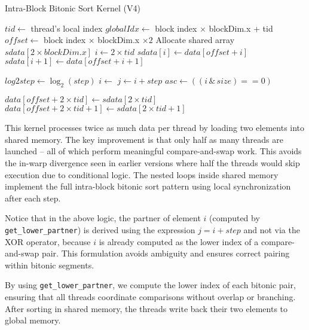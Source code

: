 \documentclass{article}
\begin{document}
\begin{algorithm}[H]
\caption{Intra-Block Bitonic Sort Kernel (V4)}
\begin{algorithmic}[1]
    \State $tid \gets$ thread's local index
    \State $globalIdx \gets$ block index $\times$ blockDim.x + tid
     \Return \EndIf
    \State $offset \gets$ block index $\times$ blockDim.x $\times 2$
    \State Allocate shared array $sdata[2 \times blockDim.x]$
    \State $i \gets 2 \times tid$
    \State $sdata[i] \gets data[offset + i]$
    \State $sdata[i + 1] \gets data[offset + i + 1]$
    \State {}
    
            \State $log2step \gets \log_2(step)$
            \State $i \gets$ 
            \State $j \gets i + step$
            \State $asc \gets ((i \,\&\, size) == 0)$
                \State {}
            \EndIf
            \State {}
        \EndFor
    \EndFor

    \State $data[offset + 2 \times tid] \gets sdata[2 \times tid]$
    \State $data[offset + 2 \times tid + 1] \gets sdata[2 \times tid + 1]$
\EndProcedure
\end{algorithmic}
\end{algorithm}

This kernel processes twice as much data per thread by loading two elements into shared memory. The key 
improvement is that only half as many threads are launched -- all of which perform meaningful compare-and-swap 
work. This avoids the in-warp divergence seen in earlier versions where half the threads would skip execution 
due to conditional logic. The nested loops inside shared memory implement the full intra-block bitonic sort 
pattern using local synchronization after each step.

Notice that in the above logic, the partner of element $i$ (computed by \texttt{get\_lower\_partner}) is derived 
using the expression $j = i + step$ and not via the XOR operator, because $i$ is already computed as the lower 
index of a compare-and-swap pair. This formulation avoids ambiguity and ensures correct pairing within bitonic 
segments.

By using \texttt{get\_lower\_partner}, we compute the lower index of each bitonic pair, ensuring that all 
threads coordinate comparisons without overlap or branching. After sorting in shared memory, the threads 
write back their two elements to global memory.
\end{document}

